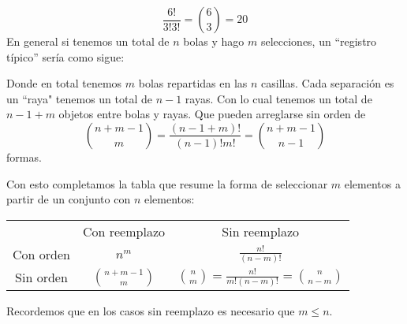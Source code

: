 \documentclass[14pt]{extreport}
\begin{document}
$$
\frac{6!}{3!3!} = \binom{6}{3} = 20
$$ 
En general si tenemos un total de $n$ bolas y hago $m$ selecciones, un ``registro típico'' sería como sigue:
\begin{center}
\end{center}
 Donde en total tenemos $m$ bolas repartidas en las $n$ casillas. Cada separación es un ``raya" tenemos un total de $n - 1$ rayas. Con lo cual tenemos un total de $n - 1 + m$ objetos entre bolas y rayas. Que pueden arreglarse sin orden de 
 $$
 \binom{n+m-1}{m}=\frac{(n-1+m)!}{(n-1)!m!} = \binom{n+m-1}{n-1}
 $$
 formas.

Con esto completamos la tabla que resume la forma de seleccionar $m$ elementos a partir de un conjunto con $n$ elementos: 

\begin{center}
  \begin{table}[h]
    \begin{tabular}{c|c|c|}
      \multicolumn{1}{c}{}           & \multicolumn{1}{c}{Con reemplazo} & \multicolumn{1}{c}{Sin reemplazo}                   \\[0.5ex] \cline{2-3}
      \multicolumn{1}{c|}{Con orden} & $n^m$                             & $\frac{n!}{(n-m)!}$                                 \\[0.5ex]\cline{2-3}
      \multicolumn{1}{c|}{Sin orden} & $\binom{n+m-1}{m}$                                 & $\binom{n}{m} = \frac{n!}{m!(n-m)!}=\binom{n}{n-m}$ \\\cline{2-3}
    \end{tabular}
  \end{table}
\end{center}
Recordemos que en los casos sin reemplazo es necesario que $m \leq n$.
\end{document}
